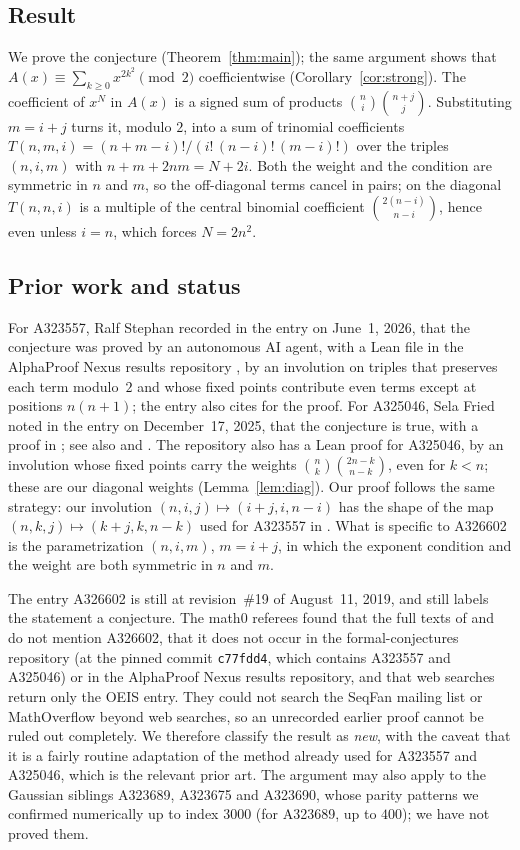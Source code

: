 \documentclass[11pt]{amsart}
\theoremstyle{plain}
\theoremstyle{definition}
\begin{document}
\subsection*{Result}
We prove the conjecture (Theorem~\ref{thm:main}); the same argument shows that $A(x)\equiv\sum_{k\ge0}x^{2k^2}\pmod 2$ coefficientwise (Corollary~\ref{cor:strong}).
The coefficient of $x^N$ in $A(x)$ is a signed sum of products $\binom ni\binom{n+j}{j}$. Substituting $m=i+j$ turns it, modulo $2$, into a sum of trinomial coefficients $T(n,m,i)=(n+m-i)!/(i!\,(n-i)!\,(m-i)!)$ over the triples $(n,i,m)$ with $n+m+2nm=N+2i$. Both the weight and the condition are symmetric in $n$ and $m$, so the off-diagonal terms cancel in pairs; on the diagonal $T(n,n,i)$ is a multiple of the central binomial coefficient $\binom{2(n-i)}{n-i}$, hence even unless $i=n$, which forces $N=2n^2$.

\subsection*{Prior work and status}
For A323557, Ralf Stephan recorded in the entry on June~1, 2026, that the conjecture was proved by an autonomous AI agent, with a Lean file in the AlphaProof Nexus results repository \cite{APN}, by an involution on triples that preserves each term modulo~$2$ and whose fixed points contribute even terms except at positions $n(n+1)$; the entry also cites \cite[Appendix~A]{Ad} for the proof.
For A325046, Sela Fried noted in the entry on December~17, 2025, that the conjecture is true, with a proof in \cite{Fr25}; see also \cite[Section~3.8, Theorem~50]{Fr} and \cite[Appendix~A]{Ad}. The repository \cite{APN} also has a Lean proof for A325046, by an involution whose fixed points carry the weights $\binom nk\binom{2n-k}{n-k}$, even for $k<n$; these are our diagonal weights (Lemma~\ref{lem:diag}).
Our proof follows the same strategy: our involution $(n,i,j)\mapsto(i+j,i,n-i)$ has the shape of the map $(n,k,j)\mapsto(k+j,k,n-k)$ used for A323557 in \cite[Appendix~A]{Ad}. What is specific to A326602 is the parametrization $(n,i,m)$, $m=i+j$, in which the exponent condition and the weight are both symmetric in $n$ and $m$.

The entry A326602 is still at revision~\#19 of August~11, 2019, and still labels the statement a conjecture.
The math0 referees found that the full texts of \cite{Ad} and \cite{Fr} do not mention A326602, that it does not occur in the formal-conjectures repository \cite{FC} (at the pinned commit \texttt{c77fdd4}, which contains A323557 and A325046) or in the AlphaProof Nexus results repository, and that web searches return only the OEIS entry. They could not search the SeqFan mailing list or MathOverflow beyond web searches, so an unrecorded earlier proof cannot be ruled out completely.
We therefore classify the result as \emph{new}, with the caveat that it is a fairly routine adaptation of the method already used for A323557 and A325046, which is the relevant prior art.
The argument may also apply to the Gaussian siblings A323689, A323675 and A323690, whose parity patterns we confirmed numerically up to index $3000$ (for A323689, up to $400$); we have not proved them.
\end{document}
